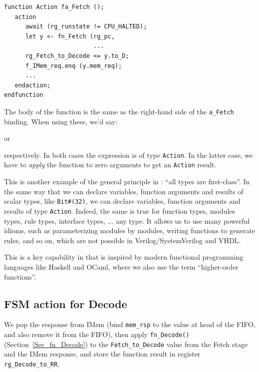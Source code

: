 {\footnotesize
\begin{Verbatim}[frame=single]
function Action fa_Fetch ();
   action
      await (rg_runstate != CPU_HALTED);
      let y <- fn_Fetch (rg_pc,
                         ...
      rg_Fetch_to_Decode <= y.to_D;
      f_IMem_req.enq (y.mem_req);
      ...
   endaction;
endfunction
\end{Verbatim}
}

The body of the function is the same as the right-hand side of the
\verb|a_Fetch| binding.  When using these, we'd say:

\begin{center}
 \hmm or \hmm {}
\end{center}

respectively.  In both cases the expression is of type \verb|Action|.
In the latter case, we have to \emph{apply} the function to zero
arguments to get an {\tt Action} result.


This is another example of the general principle in {\BSV}: ``all
types are first-class''.  In the same way that we can declare
variables, function arguments and results of scalar types, like
\verb|Bit#(32)|, we can declare variables, function arguments and
results of type {\tt Action}.  Indeed, the same is true for function
types, modules types, rule types, interface types, ... any type.  It
allows us to use many powerful idioms, such as parameterizing modules
by modules, writing functions to generate rules, and so on, which are
not possible in Verilog/SystemVerilog and VHDL.



This is a key capability in {\BSV} that is inspired by modern
functional programming languages like Haskell and OCaml, where we also
use the term ``higher-order functions''.


\subsection{FSM action for Decode}


We pop the response from IMem (bind \verb|mem_rsp| to the value at
head of the FIFO, and also remove it from the FIFO), then apply
\verb|fn_Decode()| (Section~\ref{Sec_fn_Decode}) to the
\verb|Fetch_to_Decode| value from the Fetch stage and the IMem
response, and store the function result in register
\verb|rg_Decode_to_RR|.

